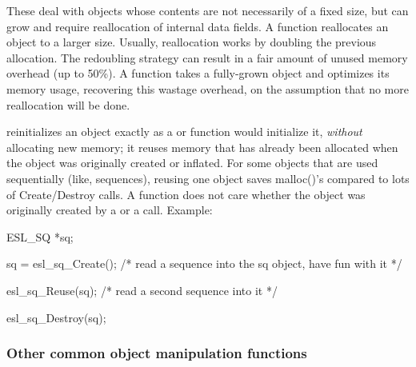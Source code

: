 \begin{sreitems}{}
\item [\ccode{Expand,Squeeze}]
   These deal with objects whose contents are not necessarily of a
   fixed size, but can grow and require reallocation of internal data
   fields. A function  reallocates an
    object to a larger size. Usually, reallocation
   works by doubling the previous allocation. The redoubling strategy
   can result in a fair amount of unused memory overhead (up to
   50\%). A function  takes a fully-grown
   object and optimizes its memory usage, recovering this wastage
   overhead, on the assumption that no more reallocation will be
   done.



\item [\ccode{Reuse}] 
    reinitializes an object exactly as a
    or  function would initialize it, \emph{without}
   allocating new memory; it reuses memory that has
   already been allocated when the object was originally created or
   inflated. For some objects that are used sequentially (like,
   sequences), reusing one object saves malloc()'s compared to
   lots of Create/Destroy calls. A  function does not
   care whether the object was originally created by a 
   or a  call. Example:

\begin{cchunk}
ESL_SQ *sq;

sq = esl_sq_Create();
  /* read a sequence into the sq object, have fun with it */

esl_sq_Reuse(sq);
  /* read a second sequence into it */

esl_sq_Destroy(sq);
\end{cchunk}

\end{sreitems}

\subsubsection{Other common object manipulation functions}

